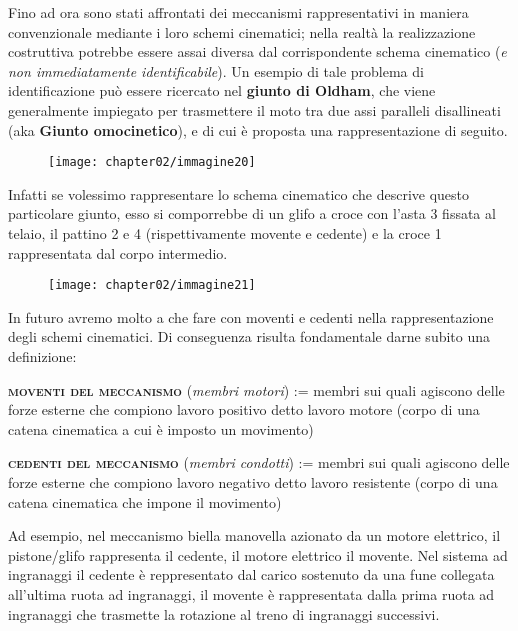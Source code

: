 Fino ad ora sono stati affrontati dei meccanismi rappresentativi in maniera convenzionale mediante i loro schemi cinematici; nella realtà la realizzazione costruttiva potrebbe essere assai diversa dal corrispondente schema cinematico (\emph{e non immediatamente identificabile}).\newline
Un esempio di tale problema di identificazione può essere ricercato nel \textbf{giunto di Oldham}, che viene generalmente impiegato per trasmettere il moto tra due assi paralleli disallineati (aka \textbf{Giunto omocinetico}), e di cui è proposta una rappresentazione di seguito.

\begin{figure}[h]
\centering
\texttt{[image: chapter02/immagine20]}
\end{figure}

Infatti se volessimo rappresentare lo schema cinematico che descrive questo particolare giunto, esso si comporrebbe di un glifo a croce con l'asta 3 fissata al telaio, il pattino 2 e 4 (rispettivamente movente e cedente) e la croce 1 rappresentata dal corpo intermedio.

\begin{figure}[h]
\centering
\texttt{[image: chapter02/immagine21]}
\end{figure}


In futuro avremo molto a che fare con moventi e cedenti nella rappresentazione degli schemi cinematici. 
Di conseguenza risulta fondamentale darne subito una definizione:
\vspace{2mm}

{\scshape{\bfseries moventi del meccanismo}} (\emph{membri motori}) := membri sui quali agiscono delle forze esterne che compiono lavoro positivo detto lavoro motore (corpo di una catena cinematica a cui è imposto un movimento)

{\scshape{\bfseries cedenti del meccanismo}} (\emph{membri condotti}) := membri sui quali agiscono delle forze esterne che compiono lavoro negativo detto lavoro resistente (corpo di una catena cinematica che impone il movimento)
\vspace{2mm}

Ad esempio, nel meccanismo biella manovella azionato da un motore elettrico, il pistone/glifo rappresenta il cedente, il motore elettrico il movente.
Nel sistema ad ingranaggi il cedente è reppresentato dal carico sostenuto da una fune collegata all'ultima ruota ad ingranaggi, il movente è rappresentata dalla prima ruota ad ingranaggi che trasmette la rotazione al treno di ingranaggi successivi.


